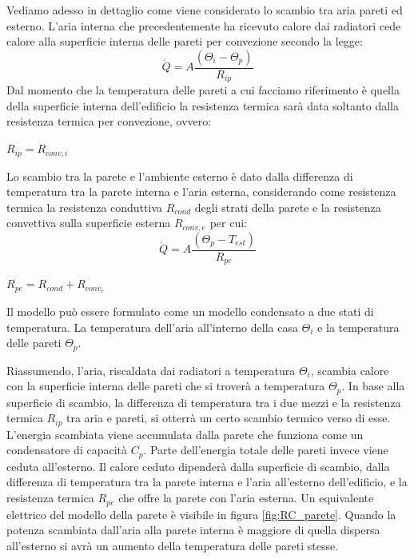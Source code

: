 \documentclass[laurea,oneside,11pt]{USiena_tesiLM}
\begin{document}
Vediamo adesso in dettaglio come viene considerato lo scambio tra aria pareti ed esterno. L'aria interna che precedentemente ha ricevuto calore dai radiatori cede calore alla superficie interna delle pareti per convezione secondo la legge:
\begin{equation}
\dot{Q} = A \frac{(\Theta_i - \Theta_p)}{R_{ip}} 
\end{equation} 
Dal momento che la temperatura delle pareti a cui facciamo riferimento è quella della superficie interna dell'edificio la resistenza termica sarà data soltanto dalla resistenza termica per convezione, ovvero:
\begin{center}
$R_{ip} = R_{conv,i}$
\end{center}

Lo scambio tra la parete e l'ambiente esterno è dato dalla differenza di temperatura tra la parete interna e l'aria  esterna, considerando come resistenza termica la resistenza conduttiva $R_{cond}$ degli strati della parete e la resistenza convettiva sulla superficie esterna $R_{conv,e}$ per cui:
\begin{equation}
\dot{Q} = A \frac{(\Theta_p - T_{est})}{R_{pe}} 
\end{equation} 
\begin{center}
$R_{pe} = R_{cond} + R_{conv_e}$
\end{center}

Il modello può essere formulato come un modello condensato a due stati di temperatura. La temperatura dell'aria all'interno della casa $\Theta_i$ e la temperatura delle pareti $\Theta_p$.

Riassumendo, l'aria, riscaldata dai radiatori a temperatura $\Theta_i$, scambia calore con la superficie interna delle pareti che si troverà a temperatura $\Theta_p$. In base alla superficie di scambio, la differenza di temperatura tra i due mezzi e la resistenza termica $R_{ip}$ tra aria e pareti, si otterrà un certo scambio termico verso di esse. L'energia scambiata viene accumulata dalla parete che funziona come un condensatore di capacità $C_p$. Parte dell'energia totale delle pareti invece viene ceduta all'esterno. Il calore ceduto dipenderà dalla superficie di scambio, dalla differenza di temperatura tra la parete interna e l'aria all'esterno dell'edificio, e la resistenza termica $R_{pe}$ che offre la parete con l'aria esterna.  Un equivalente elettrico del modello della parete è visibile in figura \ref{fig:RC_parete}.
Quando la potenza scambiata dall'aria alla parete  interna è maggiore di quella dispersa all'esterno si avrà un aumento della temperatura delle pareti stesse.
\end{document}
